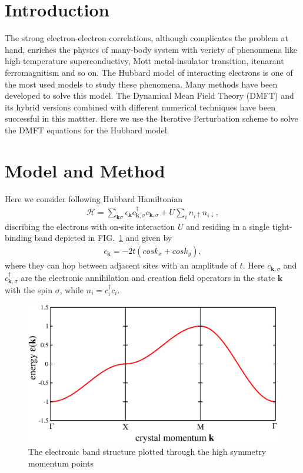 \documentclass[aps,prl,twocolumn,showpacs,floatfix,superscriptaddress]{revtex4-1}
\begin{document}

\section{\label{sec:intro}Introduction}
The strong electron-electron correlations, although complicates the problem at hand, enriches the physics of many-body system with veriety of phenonmena like high-temperature superconductivy, Mott metal-insulator transition, itenarant ferromagnitism and so on\cite{georges}. The Hubbard model of interacting electrons is one of the most used models to study these phenomena. Many methods have been developed to solve this model. The Dynamical Mean Field Theory (DMFT) and its hybrid versions combined with different numerical techniques have been successful in this mattter\cite{georges}. Here we use the Iterative Perturbation scheme to solve the DMFT equations for the Hubbard model. 
\section{\label{sec:method}Model and Method}
Here  we consider following Hubbard Hamiltonian
\begin{eqnarray}
        \mathcal{H} =  \sum_{\textbf{k}\sigma} \epsilon_{\textbf{k}}c_{\textbf{k},\sigma}^{\dagger}
        c_{\textbf{k},\sigma} + U \sum_i n_{i\uparrow}n_{i\downarrow},
\end{eqnarray}
discribing the electrons with on-site interaction $U$ and residing in a single tight-binding band depicted in FIG.~\ref{fig:1} and given by 
\begin{eqnarray}
        \epsilon_{\textbf{k} } = -2t(cosk_x + cosk_y),
\end{eqnarray}
where they can hop between adjacent sites with an amplitude of $t$. Here $c_{\textbf{k},\sigma}$ and $c_{\textbf{k},\sigma}^{\dagger}$ are the electronic annihilation and creation field operators in the state $\textbf{k}$ with the spin $\sigma$, while $n_i = c_i^\dagger c_i$.
	\begin{figure}
		\includegraphics[scale=0.3,angle=0]{band}
		\caption{The electronic band structure plotted through the high symmetry momentum points}
		\label{fig:1}
	\end{figure}
\end{document}
